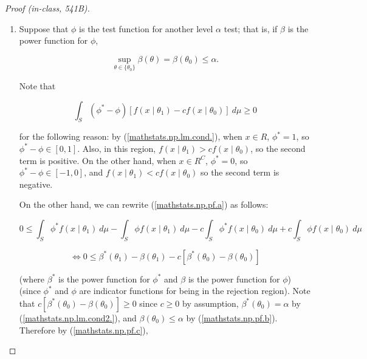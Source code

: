 \begin{proof}[Proof (in-class, 541B)]

\begin{enumerate}

\item

Suppose that \(\phi\) is the test function for another level \(\alpha\) test; that is, if \(\beta\) is the power function for \(\phi\),

\begin{equation}\label{mathstats.np.pf.b}
\sup_{\theta \in \{\theta_0\}} \beta(\theta) = \beta(\theta_0) \leq \alpha.
\end{equation}

Note that 

\begin{equation}\label{mathstats.np.pf.a}
\int_S (\phi^* - \phi) \left[ f(x \mid \theta_1) - c f(x \mid \theta_0) \right] \ d\mu \geq 0
\end{equation}

for the following reason: by (\ref{mathstats.np.lm.cond.}), when \(x \in R\), \(\phi^* = 1\), so \(\phi^* - \phi \in [0, 1]\). Also, in this region, \(f(x \mid \theta_1) > c f(x \mid \theta_0)\), so the second term is positive. On the other hand, when \(x \in R^C\), \(\phi^* = 0\), so \(\phi^* - \phi \in [-1, 0]\), and \(f(x \mid \theta_1) < c f(x \mid \theta_0)\) so the second term is negative.

On the other hand, we can rewrite (\ref{mathstats.np.pf.a}) as follows:


\[
0 \leq  \int_S \phi^*  f(x \mid \theta_1) \ d\mu    
- \int_S \phi   f(x \mid \theta_1)  \ d\mu
-  c \int_S \phi^*   f(x \mid \theta_0) \ d\mu
+ c \int_S \phi   f(x \mid \theta_0) \ d\mu
\]

\begin{equation}\label{mathstats.np.pf.c}
\iff 0 \leq \beta^*(\theta_1) - \beta(\theta_1) - c \left[ \beta^*(\theta_0) - \beta(\theta_0) \right]
\end{equation}


(where \(\beta^*\) is the power function for \(\phi^*\) and \(\beta\) is the power function for \(\phi\)) (since \(\phi^*\) and \(\phi\) are indicator functions for being in the rejection region). Note that \(c \left[ \beta^*(\theta_0) - \beta(\theta_0) \right] \geq 0\) since \(c \geq 0\) by assumption, \( \beta^*(\theta_0) = \alpha\) by (\ref{mathstats.np.lm.cond2.}), and \(\beta(\theta_0)  \leq \alpha\) by (\ref{mathstats.np.pf.b}). Therefore by (\ref{mathstats.np.pf.c}),


\end{enumerate}
\end{proof}
